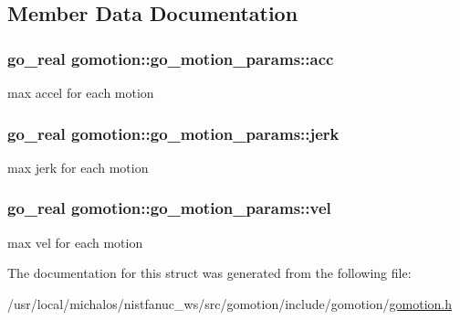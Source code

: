 \subsection{Member Data Documentation}
\hypertarget{structgomotion_1_1go__motion__params_a494815c0bc4016f78b82e2005ee6ad70}{
\subsubsection[{acc}]{\setlength{\rightskip}{0pt plus 5cm}go\-\_\-real gomotion\-::go\-\_\-motion\-\_\-params\-::acc}}\label{structgomotion_1_1go__motion__params_a494815c0bc4016f78b82e2005ee6ad70}
max accel for each motion \hypertarget{structgomotion_1_1go__motion__params_a25db76d9565efdc899bc8bc28b4a7c32}{
\subsubsection[{jerk}]{\setlength{\rightskip}{0pt plus 5cm}go\-\_\-real gomotion\-::go\-\_\-motion\-\_\-params\-::jerk}}\label{structgomotion_1_1go__motion__params_a25db76d9565efdc899bc8bc28b4a7c32}
max jerk for each motion \hypertarget{structgomotion_1_1go__motion__params_ad3121c36c5257557895df5d036b22c9d}{
\subsubsection[{vel}]{\setlength{\rightskip}{0pt plus 5cm}go\-\_\-real gomotion\-::go\-\_\-motion\-\_\-params\-::vel}}\label{structgomotion_1_1go__motion__params_ad3121c36c5257557895df5d036b22c9d}
max vel for each motion 

The documentation for this struct was generated from the following file\-:\begin{DoxyCompactItemize}
\item 
/usr/local/michalos/nistfanuc\-\_\-ws/src/gomotion/include/gomotion/\hyperlink{gomotion_8h}{gomotion.\-h}\end{DoxyCompactItemize}
